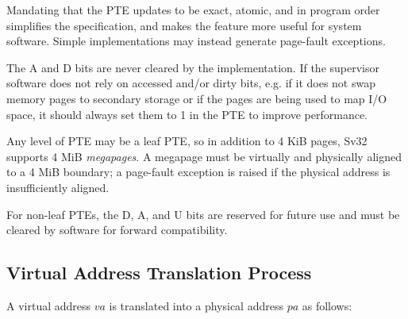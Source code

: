 \begin{commentary}
Mandating that the PTE updates to be exact, atomic, and in program order
simplifies the specification, and makes the feature more useful for system
software.  Simple implementations may instead generate page-fault exceptions.
  
The A and D bits are never cleared by the implementation.  If the
supervisor software does not rely on accessed and/or dirty bits,
e.g. if it does not swap memory pages to secondary storage or if the
pages are being used to map I/O space, it should always set them to 1
in the PTE to improve performance.
\end{commentary}

Any level of PTE may be a leaf PTE, so in addition to 4 KiB pages, Sv32
supports 4 MiB {\em megapages}.  A megapage must be virtually and
physically aligned to a 4 MiB boundary; a page-fault exception is raised
if the physical address is insufficiently aligned.

For non-leaf PTEs, the D, A, and U bits are reserved for future use and
must be cleared by software for forward compatibility.

\subsection{Virtual Address Translation Process}
\label{sv32algorithm}

A virtual address $va$ is translated into a physical address $pa$ as
follows:

